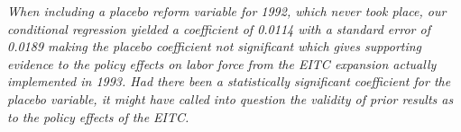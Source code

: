 \documentclass{article}
\begin{document}
\begin{enumerate}
\textit{  When including a placebo reform variable for 1992, which never took place, our conditional regression yielded a coefficient of 0.0114 with a standard error of 0.0189 making the placebo coefficient not significant which gives supporting evidence to the policy effects on labor force from the EITC expansion actually implemented in 1993. Had there been a statistically significant coefficient for the placebo variable, it might have called into question the validity of prior results as to the policy effects of the EITC.  }



\end{enumerate}
\end{document}
